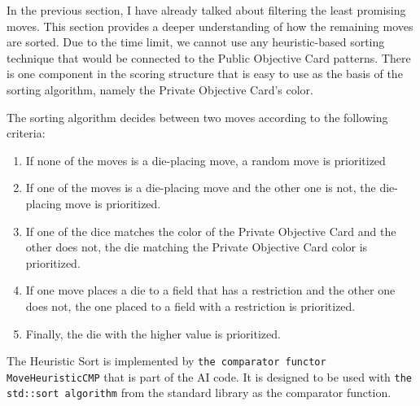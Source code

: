 In the previous section, I have already talked about filtering the least promising moves. This section provides a deeper understanding of how the remaining moves are sorted.
Due to the time limit, we cannot use any heuristic-based sorting technique that would be connected to the Public Objective Card patterns. There is one component in the scoring
structure that is easy to use as the basis of the sorting algorithm, namely the Private Objective Card's color.

The sorting algorithm decides between two moves according to the following criteria:
\begin{enumerate}
    \item If none of the moves is a die-placing move, a random move is prioritized
    \item If one of the moves is a die-placing move and the other one is not, the die-placing move is prioritized. 
    \item If one of the dice matches the color of the Private Objective Card and the other does not, the die matching the Private Objective Card color is prioritized.
    \item If one move places a die to a field that has a restriction and the other one does not, the one placed to a field with a restriction is prioritized.
    \item Finally, the die with the higher value is prioritized.
\end{enumerate}

The Heuristic Sort is implemented by \texttt{the comparator functor MoveHeuristicCMP} that is part of the AI code. It is designed to be used with \texttt{the std::sort algorithm} 
from the standard library as the comparator function.